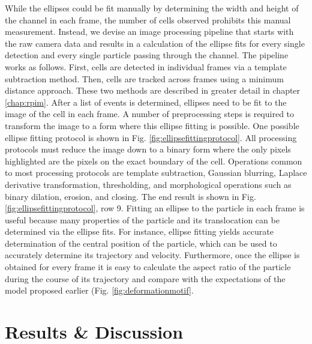 			While the ellipses could be fit manually by determining the width and height of the channel in each frame, the number of cells observed prohibits this manual measurement. Instead, we devise an image processing pipeline that starts with the raw camera data and results in a calculation of the ellipse fits for every single detection and every single particle passing through the channel. The pipeline works as follows. First, cells are detected in individual frames via a template subtraction method. Then, cells are tracked across frames using a minimum distance approach. These two methods are described in greater detail in chapter \ref{chap:rpim}. After a list of events is determined, ellipses need to be fit to the image of the cell in each frame. A number of preprocessing steps is required to transform the image to a form where this ellipse fitting is possible. One possible ellipse fitting protocol is shown in Fig. \ref{fig:ellipsefittingprotocol}. All processing protocols must reduce the image down to a binary form where the only pixels highlighted are the pixels on the exact boundary of the cell. Operations common to most processing protocols are template subtraction, Gaussian blurring, Laplace derivative transformation, thresholding, and morphological operations such as binary dilation, erosion, and closing. The end result is shown in Fig. \ref{fig:ellipsefittingprotocol}, row 9. Fitting an ellipse to the particle in each frame is useful because many properties of the particle and its translocation can be determined via the ellipse fits. For instance, ellipse fitting yields accurate determination of the central position of the particle, which can be used to accurately determine its trajectory and velocity. Furthermore, once the ellipse is obtained for every frame it is easy to calculate the aspect ratio of the particle during the course of its trajectory and compare with the expectations of the model proposed earlier (Fig. \ref{fig:deformationmotif}.
			
			
	
	\section{Results \& Discussion}
	
